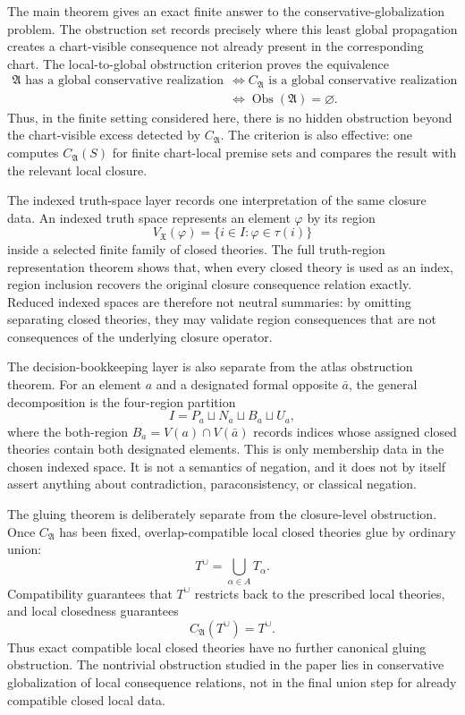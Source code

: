 \documentclass[11pt]{amsart}
\numberwithin{equation}{section}
\theoremstyle{plain}
\theoremstyle{definition}
\theoremstyle{remark}
\newcommand{\X}{\mathfrak X}
\newcommand{\A}{\mathfrak A}
\newcommand{\Obs}{\operatorname{Obs}}
\newcommand{\CA}{C_{\mathfrak A}}
\newcommand{\Tcup}{T^{\cup}}
\begin{document}
The main theorem gives an exact finite answer to the conservative-globalization problem.  The obstruction set records precisely where this least global propagation creates a chart-visible consequence not already present in the corresponding chart.  The local-to-global obstruction criterion proves the equivalence
\[
\begin{aligned}
  \A\text{ has a global conservative realization}
  &\Longleftrightarrow
  \CA\text{ is a global conservative realization} \\
  &\Longleftrightarrow
  \Obs(\A)=\varnothing.
\end{aligned}
\]
Thus, in the finite setting considered here, there is no hidden obstruction beyond the chart-visible excess detected by \(\CA\).  The criterion is also effective: one computes \(\CA(S)\) for finite chart-local premise sets and compares the result with the relevant local closure.

The indexed truth-space layer records one interpretation of the same closure data.  An indexed truth space represents an element \(\varphi\) by its region
\[
  V_{\X}(\varphi)=\{i\in I:\varphi\in\tau(i)\}
\]
inside a selected finite family of closed theories.  The full truth-region representation theorem shows that, when every closed theory is used as an index, region inclusion recovers the original closure consequence relation exactly.  Reduced indexed spaces are therefore not neutral summaries: by omitting separating closed theories, they may validate region consequences that are not consequences of the underlying closure operator.

The decision-bookkeeping layer is also separate from the atlas obstruction theorem.  For an element \(a\) and a designated formal opposite \(\bar a\), the general decomposition is the four-region partition
\[
  I=P_a\sqcup N_a\sqcup B_a\sqcup U_a,
\]
where the both-region \(B_a=V(a)\cap V(\bar a)\) records indices whose assigned closed theories contain both designated elements.  This is only membership data in the chosen indexed space.  It is not a semantics of negation, and it does not by itself assert anything about contradiction, paraconsistency, or classical negation.

The gluing theorem is deliberately separate from the closure-level obstruction.  Once \(\CA\) has been fixed, overlap-compatible local closed theories glue by ordinary union:
\[
  \Tcup=\bigcup_{\alpha\in A}T_\alpha.
\]
Compatibility guarantees that \(\Tcup\) restricts back to the prescribed local theories, and local closedness guarantees
\[
  \CA(\Tcup)=\Tcup.
\]
Thus exact compatible local closed theories have no further canonical gluing obstruction.  The nontrivial obstruction studied in the paper lies in conservative globalization of local consequence relations, not in the final union step for already compatible closed local data.
\end{document}
